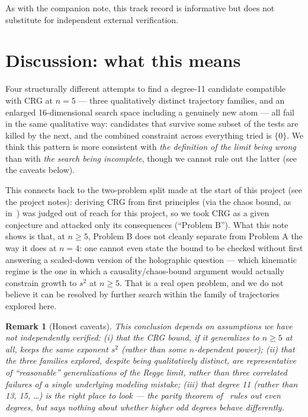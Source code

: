 \documentclass[reqno]{amsart}
\newtheorem{remark}[theorem]{Remark}
\begin{document}
As with the companion note, this track record is informative but does not substitute for
independent external verification.

\section{Discussion: what this means}
\label{sec:discussion}

Four structurally different attempts to find a degree-11 candidate compatible with CRG at $n=5$
--- three qualitatively distinct trajectory families, and an enlarged 16-dimensional search space
including a genuinely new atom --- all fail in the same qualitative way: candidates that survive
some subset of the tests are killed by the next, and the combined constraint across everything
tried is $\{0\}$. We think this pattern is more consistent with \emph{the definition of the limit
being wrong} than with \emph{the search being incomplete}, though we cannot rule out the latter
(see the caveats below).

This connects back to the two-problem split made at the start of this project (see the
project notes): deriving CRG from first principles (via the chaos bound, as
in~\cite{chaosbound2021}) was judged out of reach for this project, so we took CRG as a given
conjecture and attacked only its consequences (``Problem B''). What this note shows is that, at
$n\geq5$, Problem B does not cleanly separate from Problem A the way it does at $n=4$: one cannot
even state the bound to be checked without first answering a scaled-down version of the
holographic question --- which kinematic regime is the one in which a causality/chaos-bound
argument would actually constrain growth to $s^2$ at $n\geq5$. That is a real open problem, and we
do not believe it can be resolved by further search within the family of trajectories explored
here.

\begin{remark}[Honest caveats]
This conclusion depends on assumptions we have not independently verified: (i) that the CRG bound,
if it generalizes to $n\geq5$ at all, keeps the same exponent $s^2$ (rather than some
$n$-dependent power); (ii) that the three families explored, despite being qualitatively distinct,
are representative of ``reasonable'' generalizations of the Regge limit, rather than three
correlated failures of a single underlying modeling mistake; (iii) that degree 11 (rather than 13,
15, \ldots) is the right place to look --- the parity theorem of~\cite{fivephotons} rules out even
degrees, but says nothing about whether higher odd degrees behave differently.
\end{remark}
\end{document}
